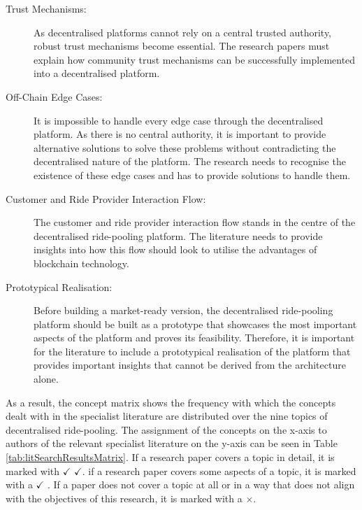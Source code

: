 \begin{description}
    \item[Trust Mechanisms:] As decentralised platforms cannot rely on a central trusted authority, robust trust mechanisms become essential. The research papers must explain how community trust mechanisms can be successfully implemented into a decentralised platform.
    
    \item[Off-Chain Edge Cases:] It is impossible to handle every edge case through the decentralised platform. As there is no central authority, it is important to provide alternative solutions to solve these problems without contradicting the decentralised nature of the platform. The research needs to recognise the existence of these edge cases and has to provide solutions to handle them.
    
    \item[Customer and Ride Provider Interaction Flow:] The customer and ride provider interaction flow stands in the centre of the decentralised ride-pooling platform. The literature needs to provide insights into how this flow should look to utilise the advantages of blockchain technology.
    
    \item[Prototypical Realisation:] Before building a market-ready version, the decentralised ride-pooling platform should be built as a prototype that showcases the most important aspects of the platform and proves its feasibility. Therefore, it is important for the literature to include a prototypical realisation of the platform that provides important insights that cannot be derived from the architecture alone.
\end{description}



As a result, the concept matrix shows the frequency with which the concepts dealt with in the specialist literature are distributed over the nine topics of decentralised ride-pooling. The assignment of the concepts on the x-axis to authors of the relevant specialist literature on the y-axis can be seen in Table \ref{tab:litSearchResultsMatrix}. If a research paper covers a topic in detail, it is marked with $\checkmark$ $\checkmark$. if a research paper covers some aspects of a topic, it is marked with a $\checkmark$ . If a paper does not cover a topic at all or in a way that does not align with the objectives of this research, it is marked with a $\times$. 



